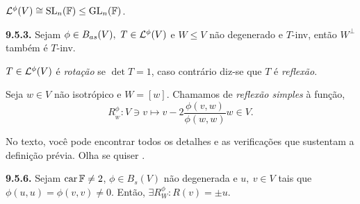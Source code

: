 
\begin{lemma}
    \(\mathcal{L}^\phi(V) \cong \operatorname{SL}_n(\mathbb{F}) \leq \operatorname{GL}_n(\mathbb{F})\). 
\end{lemma}

\begin{lemma}
    \textbf{9.5.3.} Sejam \(\phi \in B_{as}(V), \ T \in \mathcal{L}^\phi(V)\) e \(W\leq V\) não degenerado e \(T\)-inv, então \(W^\perp\) também é \(T\)-inv.  
\end{lemma}

\begin{definition}
    \(T \in \mathcal{L}^\phi(V)\) é \emph{rotação} se \(\det T = 1\), caso contrário diz-se que \(T\) é \emph{reflexão}. 
\end{definition}

\begin{definition}
    Seja \(w \in V\) não isotrópico  e \(W = [w]\). Chamamos de \emph{reflexão simples} à função, 
    \[R_{_W}^\phi : V \ni v \mapsto v - 2\frac{\phi(v,w)}{\phi(w,w)} w \in V. \]
\end{definition}
\vspace{-0.33cm}
\begin{note}
    No texto, você pode encontrar todos os detalhes e as verificações que sustentam a definição prévia. Olha se quiser \cite[Pág. 323]{MA719}. 
\end{note}

\begin{lemma}
    \textbf{9.5.6.} Sejam \(\operatorname{car} \mathbb{F} \neq 2\), \(\phi \in B_s(V)\) não degenerada e \(u,\ v\in V\) tais que \(\phi(u,u)= \phi(v,v) \neq 0 \). Então, \(\exists R^\phi_W: R(v) = \pm u\). 
\end{lemma}

